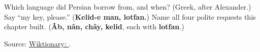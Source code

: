 \begin{tcolorbox}[breakable,colback=teal!4,colframe=teal!35!black,title={Before you move on}]
Which language did Persian borrow \textbf{} from, and when? (Greek, after Alexander.) Say “my key, please.” (\textbf{Kelid-e man, lotfan.}) Name all four polite requests this chapter built. (\textbf{Âb, nân, chây, kelid}, each with \textbf{lotfan}.)

Source: \href{https://en.wiktionary.org/wiki/\%DA\%A9\%D9\%84\%DB\%8C\%D8\%AF}{Wiktionary: }.
\end{tcolorbox}
